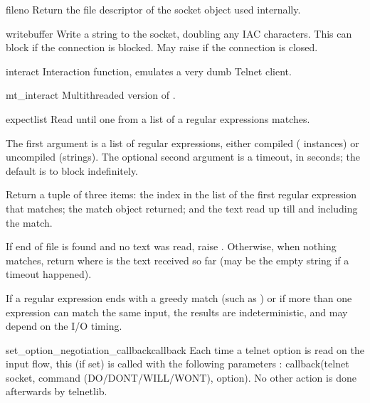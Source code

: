 \begin{methoddesc}[Telnet]{fileno}{}
Return the file descriptor of the socket object used internally.
\end{methoddesc}

\begin{methoddesc}[Telnet]{write}{buffer}
Write a string to the socket, doubling any IAC characters.
This can block if the connection is blocked.  May raise
 if the connection is closed.
\end{methoddesc}

\begin{methoddesc}[Telnet]{interact}{}
Interaction function, emulates a very dumb Telnet client.
\end{methoddesc}

\begin{methoddesc}[Telnet]{mt_interact}{}
Multithreaded version of .
\end{methoddesc}

\begin{methoddesc}[Telnet]{expect}{list}
Read until one from a list of a regular expressions matches.

The first argument is a list of regular expressions, either
compiled ( instances) or uncompiled (strings).
The optional second argument is a timeout, in seconds; the default
is to block indefinitely.

Return a tuple of three items: the index in the list of the
first regular expression that matches; the match object
returned; and the text read up till and including the match.

If end of file is found and no text was read, raise
.  Otherwise, when nothing matches, return
 where  is the text received so
far (may be the empty string if a timeout happened).

If a regular expression ends with a greedy match (such as )
or if more than one expression can match the same input, the
results are indeterministic, and may depend on the I/O timing.
\end{methoddesc}

\begin{methoddesc}[Telnet]{set_option_negotiation_callback}{callback}
Each time a telnet option is read on the input flow, this
 (if set) is called with the following parameters :
callback(telnet socket, command (DO/DONT/WILL/WONT), option).  No other
action is done afterwards by telnetlib.
\end{methoddesc}


